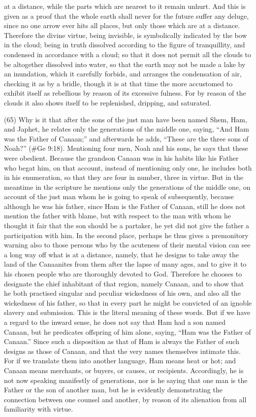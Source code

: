 at a distance, while the parts which are nearest to it remain unhurt. And this is given as a proof that
the whole earth shall never for the future suffer any deluge, since no one arrow ever hits all places,
but only those which are at a distance. Therefore the divine virtue, being invisible, is symbolically
indicated by the bow in the cloud; being in truth dissolved according to the figure of tranquillity, and
condensed in accordance with a cloud; so that it does not permit all the clouds to be altogether
dissolved into water, so that the earth may not be made a lake by an inundation, which it carefully
forbids, and arranges the condensation of air, checking it as by a bridle, though it is at that time the
more accustomed to exhibit itself as rebellious by reason of its excessive fulness. For by reason
of the clouds it also shows itself to be replenished, dripping, and saturated.

(65) Why is it that after the sons of the just man have been named Shem, Ham, and Japhet, he
relates only the generations of the middle one, saying, ``And Ham was the Father of Canaan;'' and
afterwards he adds, ``These are the three sons of Noah?'' (\#Ge 9:18). Mentioning four men,
Noah and his sons, he says that these were obedient. Because the grandson Canaan was in his
habits like his Father who begat him, on that account, instead of mentioning only one, he includes
both in his enumeration, so that they are four in number, three in virtue. But in the meantime in the
scripture he mentions only the generations of the middle one, on account of the just man whom he
is going to speak of subsequently, because although he was his father, since Ham is the Father of
Canaan, still he does not mention the father with blame, but with respect to the man with whom he
thought it fair that the son should be a partaker, he yet did not give the father a participation with
him. In the second place, perhaps he thus gives a premonitory warning also to those persons who
by the acuteness of their mental vision can see a long way off what is at a distance, namely, that
he designs to take away the land of the Canaanites from them after the lapse of many ages, and to
give it to his chosen people who are thoroughly devoted to God. Therefore he chooses to
designate the chief inhabitant of that region, namely Canaan, and to show that he both practised
singular and peculiar wickedness of his own, and also all the wickedness of his father, so that in
every part he might be convicted of an ignoble slavery and submission. This is the literal meaning
of these words. But if we have a regard to the inward sense, he does not say that Ham had a son
named Canaan, but he predicates offspring of him alone, saying, ``Ham was the Father of
Canaan.'' Since such a disposition as that of Ham is always the Father of such designs as those
of Canaan, and that the very names themselves intimate this. For if we translate them into another
language, Ham means heat or hot; and Canaan means merchants, or buyers, or causes, or
recipients. Accordingly, he is not now speaking manifestly of generations, nor is he saying that one
man is the Father or the son of another man, but he is evidently demonstrating the connection
between one counsel and another, by reason of its alienation from all familiarity with virtue.

